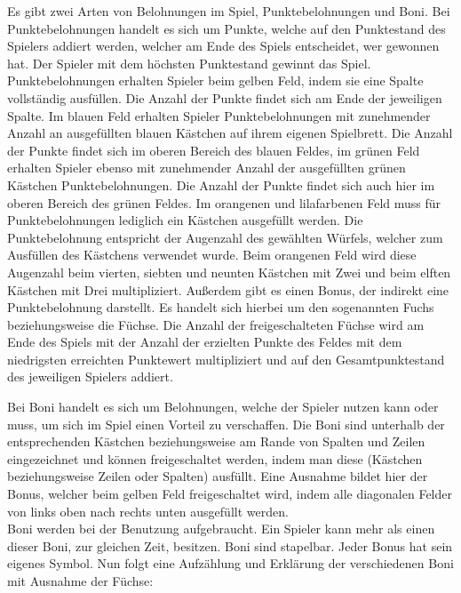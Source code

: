 Es gibt zwei Arten von Belohnungen im Spiel, Punktebelohnungen und Boni. Bei Punktebelohnungen handelt es sich um Punkte, welche auf den Punktestand des Spielers addiert werden, welcher am Ende des Spiels entscheidet, wer gewonnen hat. Der Spieler mit dem höchsten Punktestand gewinnt das Spiel. Punktebelohnungen erhalten Spieler beim gelben Feld, indem sie eine Spalte vollständig ausfüllen. Die Anzahl der Punkte findet sich am Ende der jeweiligen Spalte. Im blauen Feld erhalten Spieler Punktebelohnungen mit zunehmender Anzahl an ausgefüllten blauen Kästchen auf ihrem eigenen Spielbrett. Die Anzahl der Punkte findet sich im oberen Bereich des blauen Feldes, im grünen Feld erhalten Spieler ebenso mit zunehmender Anzahl der ausgefüllten grünen Kästchen Punktebelohnungen. Die Anzahl der Punkte findet sich auch hier im oberen Bereich des grünen Feldes. Im orangenen und lilafarbenen Feld muss für Punktebelohnungen lediglich ein Kästchen ausgefüllt werden. Die Punktebelohnung entspricht der Augenzahl des gewählten Würfels, welcher zum Ausfüllen des Kästchens verwendet wurde. Beim orangenen Feld wird diese Augenzahl beim vierten, siebten und neunten Kästchen mit Zwei und beim elften Kästchen mit Drei multipliziert. Außerdem gibt es einen Bonus, der indirekt eine Punktebelohnung darstellt. Es handelt sich hierbei um den sogenannten Fuchs beziehungsweise die Füchse. Die Anzahl der freigeschalteten Füchse wird am Ende des Spiels mit der Anzahl der erzielten Punkte des Feldes mit dem niedrigsten erreichten Punktewert multipliziert und auf den Gesamtpunktestand des jeweiligen Spielers addiert.

Bei Boni handelt es sich um Belohnungen, welche der Spieler nutzen kann oder muss, um sich im Spiel einen Vorteil zu verschaffen. Die Boni sind unterhalb der entsprechenden Kästchen beziehungsweise am Rande von Spalten und Zeilen eingezeichnet und können freigeschaltet werden, indem man diese (Kästchen beziehungsweise Zeilen oder Spalten) ausfüllt. Eine Ausnahme bildet hier der Bonus, welcher beim gelben Feld freigeschaltet wird, indem alle diagonalen Felder von links oben nach rechts unten ausgefüllt werden. \\

Boni werden bei der Benutzung aufgebraucht. Ein Spieler kann mehr als einen dieser Boni, zur gleichen Zeit, besitzen. Boni sind stapelbar. Jeder Bonus hat sein eigenes Symbol. Nun folgt eine Aufzählung und Erklärung der verschiedenen Boni mit Ausnahme der Füchse:

